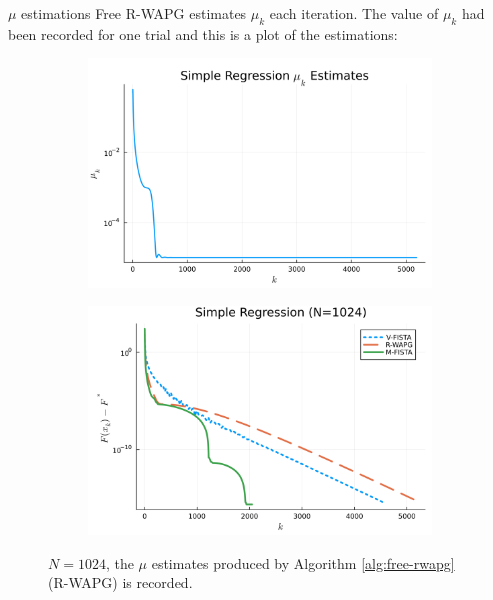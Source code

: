 \documentclass[11pt]{beamer}
\theoremstyle{definition}
\begin{document}
        \begin{frame}{$\mu$ estimations}
            Free R-WAPG estimates $\mu_k$ each iteration. 
            The value of $\mu_k$ had been recorded for one trial and this is a plot of the estimations: 
            \begin{figure}[H]
                \centering
                \begin{subfigure}[b]{0.47\textwidth}
                    \centering
                    \includegraphics[width=\textwidth]{assets/simple_regression_loss_sc_estimates_1024.png}
                \end{subfigure}
                \hfill
                \begin{subfigure}[b]{0.47\textwidth}
                    \centering
                    \includegraphics[width=\textwidth]{assets/simple_regression_loss_1024.png}
                \end{subfigure}
                \caption{
                    $N = 1024$, the $\mu$ estimates produced by Algorithm \ref{alg:free-rwapg} (R-WAPG) is recorded.
                }
                \label{fig:simple-quadratic-r-wapg-mu-estimates}
            \end{figure}
        \end{frame}
\end{document}
